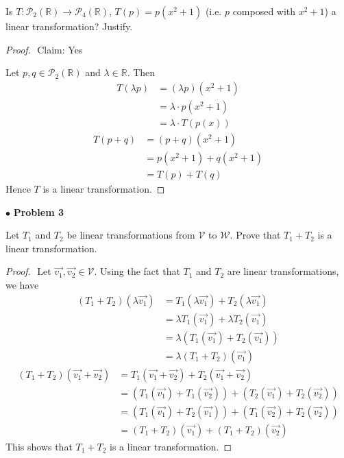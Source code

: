 \documentclass{article}
\begin{document}
\begin{itshape}
Is $T: \mathcal{P}_2(\mathbb{R}) \to \mathcal{P}_4(\mathbb{R})$, $T(p) = p(x^2+1)$ (i.e. $p$ composed with $x^2+1$) a linear transformation? Justify.
\end{itshape}
\medskip

\begin{proof}
$ $\newline
Claim: Yes

Let $p,q \in \mathcal{P}_2(\mathbb{R})$ and $\lambda \in \mathbb{R}$. Then
\begin{align*}
T(\lambda p) &= (\lambda p)(x^2+1) \\
&= \lambda \cdot p(x^2+1) \\
&= \lambda \cdot T(p(x)) 
\end{align*}
\begin{align*}
T(p+q) &= (p+q)(x^2+1) \\
&= p(x^2+1) + q(x^2+1) \\
&= T(p) + T(q)
\end{align*}
Hence $T$ is a linear transformation.
\end{proof}

\newpage
$ \bullet$ \textbf{Problem 3}
\medskip

\begin{itshape}
Let $T_1$ and $T_2$ be linear transformations from $\mathcal{V}$ to $\mathcal{W}$. Prove that $T_1 + T_2$ is a linear transformation.
\end{itshape}
\medskip

\begin{proof}
$ $\newline
Let $\vec{v_1}, \vec{v_2} \in \mathcal{V}$. Using the fact that $T_1$ and $T_2$ are linear transformations, we have
\begin{align*}
(T_1+T_2)(\lambda \vec{v_1}) &= T_1(\lambda \vec{v_1}) + T_2(\lambda \vec{v_1}) \\
&=\lambda T_1(\vec{v_1}) + \lambda T_2(\vec{v_1}) \\
&= \lambda (T_1(\vec{v_1})+ T_2(\vec{v_1})) \\
&= \lambda  (T_1+T_2)(\vec{v_1})
\end{align*}
\begin{align*}
(T_1 + T_2)(\vec{v_1} + \vec{v_2}) &= T_1(\vec{v_1} + \vec{v_2}) + T_2(\vec{v_1} + \vec{v_2}) \\
&= (T_1(\vec{v_1}) + T_1(\vec{v_2})) + (T_2(\vec{v_1}) + T_2(\vec{v_2})) \\
&= (T_1(\vec{v_1}) + T_2(\vec{v_1}) ) + (T_1(\vec{v_2}) + T_2(\vec{v_2})) \\ 
&= (T_1 +T_2)(\vec{v_1}) + (T_1 +T_2)(\vec{v_2})
\end{align*}
This shows that $T_1+T_2$ is a linear transformation.
\end{proof}
\end{document}
